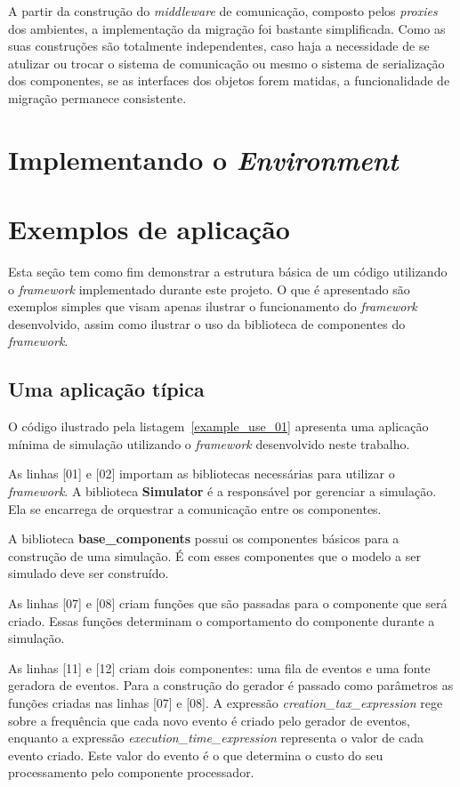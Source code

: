 A partir da construção do \textit{middleware} de comunicação, composto pelos \textit{proxies} dos ambientes, a implementação da migração foi bastante simplificada. Como as suas construções são totalmente independentes, caso haja a necessidade de se atulizar ou trocar o sistema de comunicação ou mesmo o sistema de serialização dos componentes, se as interfaces dos objetos forem matidas, a funcionalidade de migração permanece consistente.

\section{Implementando o \emph{Environment}}

\section{Exemplos de aplicação}

Esta seção tem como fim demonstrar a estrutura básica de um código utilizando o \textit{framework} implementado durante este projeto. O que é apresentado são exemplos simples que visam apenas ilustrar o funcionamento do \textit{framework} desenvolvido, assim como ilustrar o uso da biblioteca de componentes do \textit{framework}.

\subsection{Uma aplicação típica}

O código ilustrado pela listagem~\ref{example_use_01} apresenta uma aplicação mínima de simulação utilizando o \textit{framework} desenvolvido neste trabalho.

As linhas [01] e [02] importam as bibliotecas necessárias para utilizar o \textit{framework}. A biblioteca \textbf{Simulator} é a responsável por gerenciar a simulação. Ela se encarrega de orquestrar a comunicação entre os componentes.

A biblioteca \textbf{base\_components} possui os componentes básicos para a construção de uma simulação. É com esses componentes que o modelo a ser simulado deve ser construído.


As linhas [07] e [08] criam funções que são passadas para o componente que será criado. Essas funções determinam o comportamento do componente durante a simulação. 

As linhas [11] e [12] criam dois componentes: uma fila de eventos e uma fonte geradora de eventos. Para a construção do gerador é passado como parâmetros as funções criadas nas linhas [07] e [08]. A expressão \textit{creation\_tax\_expression} rege sobre a frequência que cada novo evento é criado pelo gerador de eventos, enquanto a expressão \textit{execution\_time\_expression} representa o valor de cada evento criado. Este valor do evento é o que determina o custo do seu processamento pelo componente processador.

